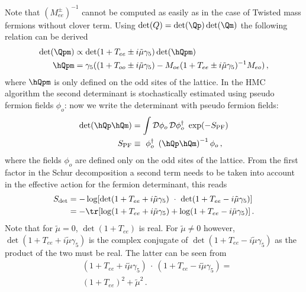 Note that $(M_{ee}^\pm)^{-1}$ cannot be computed as easily as in the
case of Twisted mass fermions without clover term.
Using $\det(Q)=\det(\Qp)\det(\Qm)$ the following relation can be derived
\begin{equation}
  \label{eq:eosw4}
  \begin{split}
    \det(\Qpm) &\propto \det(1+T_{ee} \pm i\tilde\mu\gamma_5)\det(\hQpm) \\
    \hQpm &= \gamma_5((1 + T_{oo} \pm i\tilde\mu\gamma_5) -
             M_{oe}( 1 + T_{ee} \pm i\tilde\mu\gamma_5 )^{-1}M_{eo})\, ,
  \end{split}
\end{equation}
where $\hQpm$ is only defined on the odd sites of the lattice. In the
HMC algorithm the second determinant is stochastically estimated using
pseudo fermion fields $\phi_o$: now we write the determinant with
pseudo fermion fields:
\begin{equation}
  \begin{split}
    \det(\hQp \hQm) &= \int \mathcal{D}\phi_o\,\mathcal{D}\phi^\dagger_o\
    \exp(-S_\mathrm{PF})\\
    S_\mathrm{PF} &\equiv\ \phi_o^\dagger\ \left(\hQp\hQm\right)^{-1}\phi_o\, ,
  \end{split}
\end{equation}
where the fields $\phi_o$ are defined only on the odd sites of the
lattice. From the first factor in the Schur decomposition a second
term needs to be taken into account in the effective action for the
fermion determinant, this reads
\begin{equation}
  \label{eq:swdet}
  \begin{split}
    S_{\det} &=  - \log[\det(1+T_{ee} + i\tilde\mu\gamma_5)\ \cdot\ 
    \det(1+T_{ee} - i\tilde\mu\gamma_5)]\\
    &= -\tr[\log(1+T_{ee} + i\tilde\mu\gamma_5) + \log(1+T_{ee} -
    i\tilde\mu\gamma_5)]\, .\\
  \end{split}
\end{equation}
Note that for $\tilde\mu=0$, $\det(1+T_{ee})$ is real. For
$\tilde\mu\neq0$ however, $\det(1+T_{ee}+i\tilde\mu\gamma_5)$ is the
complex conjugate of $\det(1+T_{ee}-i\tilde\mu\gamma_5)$ as the
product of the two must be real. The latter can be seen from
\[
\begin{split}
  &(1+T_{ee} + i\tilde\mu\gamma_5)\ \cdot\ (1+T_{ee} -
  i\tilde\mu\gamma_5) = \\
  &(1+T_{ee})^2 + \tilde\mu^2\, .\\
\end{split}
\]
